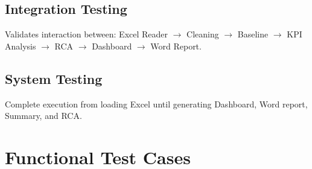 \subsection{Integration Testing}
Validates interaction between: Excel Reader $\rightarrow$ Cleaning $\rightarrow$ Baseline $\rightarrow$ KPI Analysis $\rightarrow$ RCA $\rightarrow$ Dashboard $\rightarrow$ Word Report.

\subsection{System Testing}
Complete execution from loading Excel until generating Dashboard, Word report, Summary, and RCA.

\section{Functional Test Cases}
